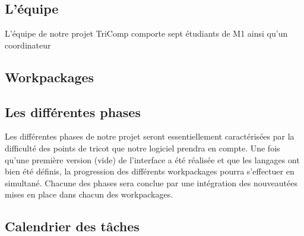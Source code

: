 \documentclass{article}
\begin{document}
\subsection{L'équipe}

L'équipe de notre projet TriComp comporte sept étudiants de M1 ainsi qu'un coordinateur

\subsection{Workpackages}


\subsection{Les différentes phases}

Les différentes phases de notre projet seront essentiellement caractérisées par la difficulté des points de tricot que notre logiciel 
prendra en compte. 
Une fois qu'une première version (vide) de l'interface a été réalisée et que les langages ont bien été définis, la progression des
différents workpackages pourra s'effectuer en simultané. Chacune des phases sera conclue par une intégration des nouveautées mises en 
place dans chacun des workpackages.

\subsection{Calendrier des tâches}
\end{document}
